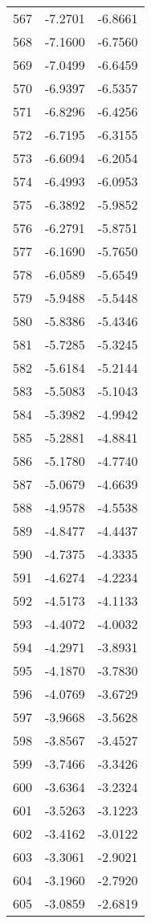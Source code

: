 \documentclass{article}
\begin{document}
\begin{longtable}{|c|c|c|}
567 & -7.2701 & -6.8661 \\
568 & -7.1600 & -6.7560 \\
569 & -7.0499 & -6.6459 \\
570 & -6.9397 & -6.5357 \\
571 & -6.8296 & -6.4256 \\
572 & -6.7195 & -6.3155 \\
573 & -6.6094 & -6.2054 \\
574 & -6.4993 & -6.0953 \\
575 & -6.3892 & -5.9852 \\
576 & -6.2791 & -5.8751 \\
577 & -6.1690 & -5.7650 \\
578 & -6.0589 & -5.6549 \\
579 & -5.9488 & -5.5448 \\
580 & -5.8386 & -5.4346 \\
581 & -5.7285 & -5.3245 \\
582 & -5.6184 & -5.2144 \\
583 & -5.5083 & -5.1043 \\
584 & -5.3982 & -4.9942 \\
585 & -5.2881 & -4.8841 \\
586 & -5.1780 & -4.7740 \\
587 & -5.0679 & -4.6639 \\
588 & -4.9578 & -4.5538 \\
589 & -4.8477 & -4.4437 \\
590 & -4.7375 & -4.3335 \\
591 & -4.6274 & -4.2234 \\
592 & -4.5173 & -4.1133 \\
593 & -4.4072 & -4.0032 \\
594 & -4.2971 & -3.8931 \\
595 & -4.1870 & -3.7830 \\
596 & -4.0769 & -3.6729 \\
597 & -3.9668 & -3.5628 \\
598 & -3.8567 & -3.4527 \\
599 & -3.7466 & -3.3426 \\
600 & -3.6364 & -3.2324 \\
601 & -3.5263 & -3.1223 \\
602 & -3.4162 & -3.0122 \\
603 & -3.3061 & -2.9021 \\
604 & -3.1960 & -2.7920 \\
605 & -3.0859 & -2.6819 \\

\end{longtable}
\end{document}
